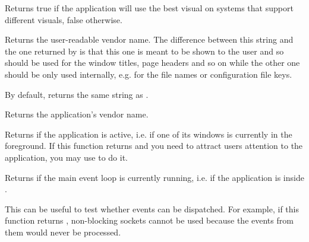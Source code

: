 \label{wxappgetusebestvisual}


Returns true if the application will use the best visual on systems that support
different visuals, false otherwise.




\label{wxappgetvendordisplayname}


Returns the user-readable vendor name. The difference between this string
and the one returned by  is that this one
is meant to be shown to the user and so should be used for the window titles,
page headers and so on while the other one should be only used internally, e.g.
for the file names or configuration file keys.

By default, returns the same string as .



\label{wxappgetvendorname}


Returns the application's vendor name.


\label{wxappisactive}


Returns \true if the application is active, i.e. if one of its windows is
currently in the foreground. If this function returns \false and you need to
attract users attention to the application, you may use 
to do it.


\label{wxappismainlooprunning}


Returns \true if the main event loop is currently running, i.e. if the
application is inside .

This can be useful to test whether events can be dispatched. For example,
if this function returns \false, non-blocking sockets cannot be used because
the events from them would never be processed.


